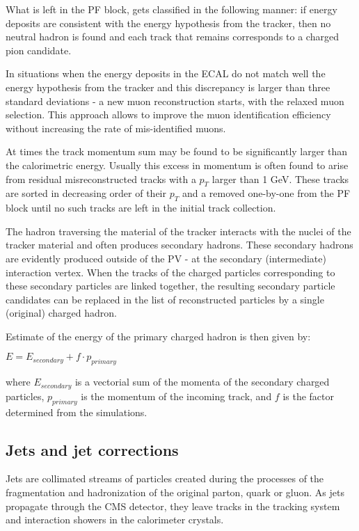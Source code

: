 \begin{small}
What is left in the PF block, gets classified in the following manner: if energy deposits are consistent with the energy hypothesis from the tracker, then no neutral hadron is found and each track that remains corresponds to a charged pion candidate. 

In situations when the energy deposits in the ECAL do not match well the energy hypothesis from the tracker and this discrepancy is larger than three standard deviations - a new muon reconstruction starts, with the relaxed muon selection. This approach allows to improve the muon identification efficiency without increasing the rate of mis-identified muons. 

At times the track momentum sum may be found to be significantly larger than the calorimetric energy. Usually this excess in momentum is often found to arise from residual misreconstructed tracks with a $p_T$ larger than 1 GeV. These tracks are sorted in decreasing order of their $p_T$ and a removed one-by-one from the PF block until no such tracks are left in the initial track collection.

The hadron traversing the material of the tracker interacts with the nuclei of the tracker material and often produces secondary hadrons. These secondary hadrons are evidently produced outside of the PV - at the secondary (intermediate) interaction  vertex. When the tracks of the charged particles corresponding to these secondary particles are linked together, the resulting secondary particle candidates can be  replaced  in  the  list of reconstructed  particles by a single (original) charged hadron.  

Estimate of the energy of the primary charged hadron is then given by:

$E = E_{secondary} + f \cdot p_{primary}$

\noindent where $E_{secondary}$ is a vectorial sum of the momenta of the secondary charged particles, $p_{primary}$ is the momentum of the incoming track, and $f$ is the factor determined from the simulations. 

\subsection{Jets and jet corrections}\label{sec:jets}

Jets are collimated streams of particles created during the processes of the fragmentation and hadronization of the original parton, quark or gluon. As jets propagate through the CMS detector, they leave tracks in the tracking system and interaction showers  in the calorimeter crystals. 


\end{small}

